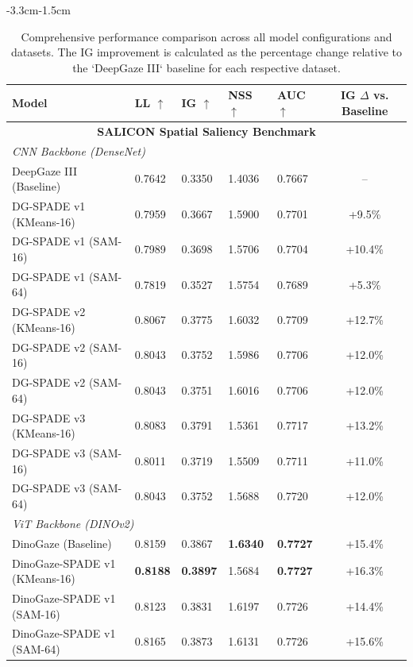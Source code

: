 \begin{table}[p!] %
\begin{adjustwidth}{-3.3cm}{-1.5cm} 
\centering
{ %
\small %
\setlength{\tabcolsep}{3pt} %

\caption{
    Comprehensive performance comparison across all model configurations and datasets. 
    The IG improvement is calculated as the percentage change relative to the `DeepGaze III` baseline for each respective dataset.
}
\label{tab:results_comprehensive}
\begin{tabular}{@{}l l l l l c@{}}
    \toprule
    \textbf{Model} & \textbf{LL} $\uparrow$ & \textbf{IG} $\uparrow$ & \textbf{NSS} $\uparrow$ & \textbf{AUC} $\uparrow$ & \textbf{IG $\Delta$ vs. Baseline} \\
    \midrule
    
    \multicolumn{6}{c}{\textbf{SALICON Spatial Saliency Benchmark}} \\
    \midrule
    \multicolumn{6}{l}{\textit{CNN Backbone (DenseNet)}} \\
    DeepGaze III (Baseline) & 0.7642 & 0.3350 & 1.4036 & 0.7667 & -- \\
    DG-SPADE v1 (KMeans-16) & 0.7959 & 0.3667 & 1.5900 & 0.7701 & +9.5\% \\
    DG-SPADE v1 (SAM-16) & 0.7989 & 0.3698 & 1.5706 & 0.7704 & +10.4\% \\
    DG-SPADE v1 (SAM-64) & 0.7819 & 0.3527 & 1.5754 & 0.7689 & +5.3\% \\
    DG-SPADE v2 (KMeans-16) & 0.8067 & 0.3775 & 1.6032 & 0.7709 & +12.7\% \\
    DG-SPADE v2 (SAM-16) & 0.8043 & 0.3752 & 1.5986 & 0.7706 & +12.0\% \\
    DG-SPADE v2 (SAM-64) & 0.8043 & 0.3751 & 1.6016 & 0.7706 & +12.0\% \\
    DG-SPADE v3 (KMeans-16) & 0.8083 & 0.3791 & 1.5361 & 0.7717 & +13.2\% \\
    DG-SPADE v3 (SAM-16) & 0.8011 & 0.3719 & 1.5509 & 0.7711 & +11.0\% \\
    DG-SPADE v3 (SAM-64) & 0.8043 & 0.3752 & 1.5688 & 0.7720 & +12.0\% \\
    \midrule
    \multicolumn{6}{l}{\textit{ViT Backbone (DINOv2)}} \\
    DinoGaze (Baseline) & 0.8159 & 0.3867 & \bfseries 1.6340 & \bfseries 0.7727 & +15.4\% \\
    DinoGaze-SPADE v1 (KMeans-16) & \bfseries 0.8188 & \bfseries 0.3897 & 1.5684 & \bfseries 0.7727 & +16.3\% \\
    DinoGaze-SPADE v1 (SAM-16) & 0.8123 & 0.3831 & 1.6197 & 0.7726 & +14.4\% \\
    DinoGaze-SPADE v1 (SAM-64) & 0.8165 & 0.3873 & 1.6131 & 0.7726 & +15.6\% \\
    \midrule
    

\end{tabular}}
\end{adjustwidth}
\end{table}
